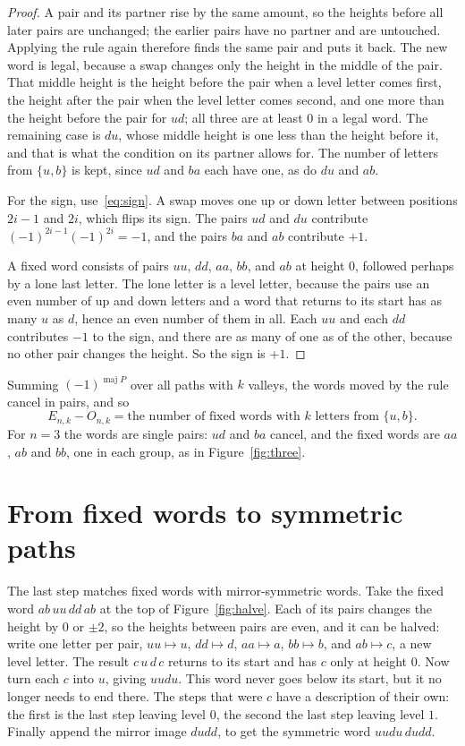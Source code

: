 \documentclass[11pt]{article}
\theoremstyle{remark}
\newcommand{\maj}{\operatorname{maj}}
\begin{document}
\begin{proof}
A pair and its partner rise by the same amount, so the heights before all later pairs are
unchanged; the earlier pairs have no partner and are untouched. Applying the rule again therefore
finds the same pair and puts it back. The new word is legal, because a swap changes only the height in
the middle of the pair. That middle height is the height before the pair when a level letter comes
first, the height after the pair when the level letter comes second, and one more than the height
before the pair for $ud$; all three are at least $0$ in a legal word. The remaining case is $du$,
whose middle height is one less than the height before it, and that is what the condition on its
partner allows for.
The number of letters from $\{u,b\}$ is kept, since $ud$ and $ba$ each have one, as do $du$ and $ab$.

For the sign, use~\eqref{eq:sign}. A swap moves one up or down letter between positions $2i-1$ and
$2i$, which flips its sign. The pairs $ud$ and $du$ contribute $(-1)^{2i-1}(-1)^{2i}=-1$, and the
pairs $ba$ and $ab$ contribute $+1$.

A fixed word consists of pairs $uu$, $dd$, $aa$, $bb$, and $ab$ at height $0$, followed perhaps by a
lone last letter. The lone letter is a level letter, because the pairs use an even number of up
and down letters and a word that returns to its start has as many $u$ as $d$, hence an even number
of them in all. Each $uu$ and each $dd$ contributes $-1$ to the sign, and there are as many of one
as of the other, because no other pair changes the height. So the sign is $+1$.
\end{proof}

Summing $(-1)^{\maj P}$ over all paths with $k$ valleys, the words moved by the rule cancel in
pairs, and so
\begin{equation}\label{eq:fixed}
E_{n,k}-O_{n,k}=\text{the number of fixed words with $k$ letters from $\{u,b\}$}.
\end{equation}
For $n=3$ the words are single pairs: $ud$ and $ba$ cancel, and the fixed words are $aa$, $ab$ and
$bb$, one in each group, as in Figure~\ref{fig:three}.

\section{From fixed words to symmetric paths}

The last step matches fixed words with mirror-symmetric words. Take the fixed word
$ab\,uu\,dd\,ab$ at the top of Figure~\ref{fig:halve}. Each of its pairs changes the height by $0$ or
$\pm2$, so the heights between pairs are even, and it can be halved: write one letter per pair, $uu\mapsto u$, $dd\mapsto d$, $aa\mapsto a$, $bb\mapsto b$, and
$ab\mapsto c$, a new level letter. The result $c\,u\,d\,c$ returns to its start and has $c$ only at
height $0$. Now turn each $c$ into $u$, giving $uudu$. This word never goes below its start, but it
no longer needs to end there. The steps that were $c$ have a description of their own: the first
is the last step leaving level $0$, the second the last step leaving level $1$. Finally append the
mirror image $dudd$, to get the symmetric word $uudu\,dudd$.
\end{document}
